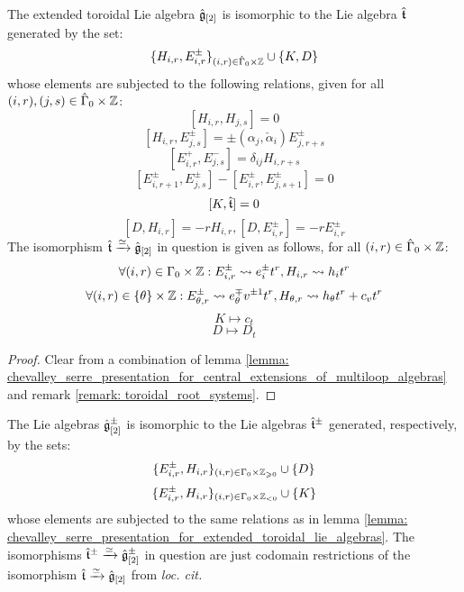         \begin{lemma} \label{lemma: chevalley_serre_presentation_for_extended_toroidal_lie_algebras}
            The extended toroidal Lie algebra $\hat{\mathfrak{g}}_{[2]}$ is isomorphic to the Lie algebra $\hat{\mathfrak{t}}$ generated by the set:
                $$\{ H_{i, r}, E_{i, r}^{\pm} \}_{(i, r) \in \hat{\Gamma}_0 \x \Z} \cup \{K, D\}$$
            whose elements are subjected to the following relations, given for all $(i, r), (j, s) \in \hat{\Gamma}_0 \x \Z$:
                $$[ H_{i, r}, H_{j, s} ] = 0$$
                $$[ H_{i, r}, E_{j, s}^{\pm} ] = \pm (\alpha_j, \check{\alpha}_i) E_{j, r + s}^{\pm}$$
                $$[ E_{i, r}^+, E_{j, s}^- ] = \delta_{ij} H_{i, r + s}$$
                $$[ E_{i, r + 1}^{\pm}, E_{j, s}^{\pm} ] - [ E_{i, r}^{\pm}, E_{j, s + 1}^{\pm} ] = 0$$
                $$[K, \hat{\mathfrak{t}}] = 0$$
                $$[D, H_{i, r}] = -r H_{i, r}, [D, E_{i, r}^{\pm}] = -r E_{i, r}^{\pm}$$
            The isomorphism $\hat{\mathfrak{t}} \xrightarrow[]{\simeq} \hat{\mathfrak{g}}_{[2]}$ in question is given as follows, for all $(i, r) \in \hat{\Gamma}_0 \x \Z$:
                $$\forall (i, r) \in \Gamma_0 \x \Z: E_{i, r}^{\pm} \mapsto e_i^{\pm} t^r, H_{i, r} \mapsto h_i t^r$$
                $$\forall (i, r) \in \{\theta\} \x \Z: E_{\theta, r}^{\pm} \mapsto e_{\theta}^{\mp} v^{\pm 1} t^r, H_{\theta, r} \mapsto h_{\theta} t^r + c_v t^r$$
                $$K \mapsto c_t$$
                $$D \mapsto D_t$$
        \end{lemma}
            \begin{proof}
                Clear from a combination of lemma \ref{lemma: chevalley_serre_presentation_for_central_extensions_of_multiloop_algebras} and remark \ref{remark: toroidal_root_systems}.
            \end{proof}
        \begin{corollary} \label{coro: chevalley_serre_presentation_for_extended_toroidal_lie_algebras}
            The Lie algebras $\hat{\mathfrak{g}}_{[2]}^{\pm}$ is isomorphic to the Lie algebras $\hat{\mathfrak{t}}^{\pm}$ generated, respectively, by the sets:
                $$\{ E_{i, r}^{\pm}, H_{i, r} \}_{(i, r) \in \Gamma_0 \x \Z_{\geq 0}} \cup \{D\}$$
                $$\{ E_{i, r}^{\pm}, H_{i, r} \}_{(i, r) \in \Gamma_0 \x \Z_{< 0}} \cup \{K\}$$
            whose elements are subjected to the same relations as in lemma \ref{lemma: chevalley_serre_presentation_for_extended_toroidal_lie_algebras}. The isomorphisms $\hat{\mathfrak{t}}^{\pm} \xrightarrow[]{\simeq} \hat{\mathfrak{g}}_{[2]}^{\pm}$ in question are just codomain restrictions of the isomorphism $\hat{\mathfrak{t}} \xrightarrow[]{\simeq} \hat{\mathfrak{g}}_{[2]}$ from \textit{loc. cit.}
        \end{corollary}
        \begin{remark}
            
        \end{remark}
            
